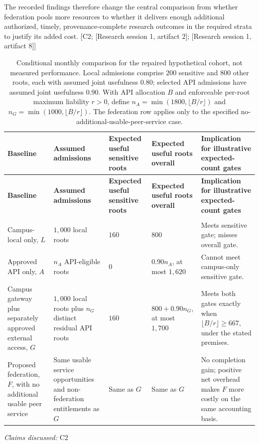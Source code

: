 \documentclass[11pt]{article}
\begin{document}
The recorded findings therefore change the central comparison from whether federation pools more resources to whether it delivers enough additional authorized, timely, provenance-complete research outcomes in the required strata to justify its added cost. [C2; [Research session 1, artifact 2]; [Research session 1, artifact 8]]

\begin{landscape}
\small
\begin{longtable}{@{}>{\raggedright\arraybackslash}p{}>{\raggedright\arraybackslash}p{}>{\raggedright\arraybackslash}p{}>{\raggedright\arraybackslash}p{}>{\raggedright\arraybackslash}p{}@{}}
\caption{Conditional monthly comparison for the repaired hypothetical cohort, not measured performance. Local admissions comprise $200$ sensitive and $800$ other roots, each with assumed joint usefulness $0.80$; selected API admissions have assumed joint usefulness $0.90$. With API allocation $B$ and enforceable per-root maximum liability $r>0$, define $n_A=\min(1800,\lfloor B/r\rfloor)$ and $n_G=\min(1000,\lfloor B/r\rfloor)$. The federation row applies only to the specified no-additional-usable-peer-service case.}\\
\toprule
\textbf{Baseline} & \textbf{Assumed admissions} & \textbf{Expected useful sensitive roots} & \textbf{Expected useful roots overall} & \textbf{Implication for illustrative expected-count gates}\\
\midrule
\endfirsthead
\toprule
\textbf{Baseline} & \textbf{Assumed admissions} & \textbf{Expected useful sensitive roots} & \textbf{Expected useful roots overall} & \textbf{Implication for illustrative expected-count gates}\\
\midrule
\endhead
\midrule
\multicolumn{5}{r}{\footnotesize Continued on next page}\\
\endfoot
\bottomrule
\endlastfoot
Campus-local only, $L$ & $1{,}000$ local roots & $160$ & $800$ & Meets sensitive gate; misses overall gate.\\
Approved API only, $A$ & $n_A$ API-eligible roots & $0$ & $0.90n_A$, at most $1{,}620$ & Cannot meet campus-only sensitive gate.\\
Campus gateway plus separately approved external access, $G$ & $1{,}000$ local roots plus $n_G$ distinct residual API roots & $160$ & $800+0.90n_G$, at most $1{,}700$ & Meets both gates exactly when $\lfloor B/r\rfloor\geq667$, under the stated premises.\\
Proposed federation, $F$, with no additional usable peer service & Same usable service opportunities and non-federation entitlements as $G$ & Same as $G$ & Same as $G$ & No completion gain; positive net overhead makes $F$ more costly on the same accounting basis.\\
\end{longtable}
\par{}
\end{landscape}
\textit{Claims discussed: }C2
\end{document}
